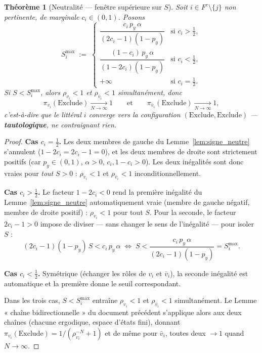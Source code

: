 \documentclass[12pt,a4paper]{article}
\newtheorem{theorem}{Théorème}[section]
\theoremstyle{remark}
\newcommand{\Exc}{\ensuremath{\mathrm{Exclude}}}
\newcommand{\vbar}{\bar{v}}
\begin{document}
\begin{theorem}[Neutralité --- fenêtre supérieure sur $S$]\label{thm:neutralite}
Soit $i\in F^c\setminus\{j\}$ non pertinente, de marginale $c_i\in(0,1)$. Posons
\[
  S_i^{\max} \;:=\;
  \begin{cases}
    \dfrac{c_i\,p_y\,\alpha}{(2c_i-1)(1-p_y)} & \text{si } c_i > \tfrac12, \\[10pt]
    \dfrac{(1-c_i)\,p_y\,\alpha}{(1-2c_i)(1-p_y)} & \text{si } c_i < \tfrac12, \\[10pt]
    +\infty & \text{si } c_i = \tfrac12.
  \end{cases}
\]
Si $S < S_i^{\max}$, alors $\rho_{v_i}<1$ \emph{et} $\rho_{\vbar_i}<1$
simultanément, donc
\[
  \pi_{v_i}(\Exc) \xrightarrow[N\to\infty]{} 1
  \qquad\text{et}\qquad
  \pi_{\vbar_i}(\Exc) \xrightarrow[N\to\infty]{} 1,
\]
c'est-à-dire que le littéral $i$ converge vers la configuration $(\Exc,\Exc)$
--- \textbf{tautologique}, ne contraignant rien.
\end{theorem}

\begin{proof}
\textbf{Cas $c_i=\tfrac12$.} Les deux membres de gauche du
Lemme~\ref{lem:signe_neutre} s'annulent ($1-2c_i=2c_i-1=0$), et les deux membres de
droite sont strictement positifs (car $p_y\in(0,1)$, $\alpha>0$, $c_i,1-c_i>0$).
Les deux inégalités sont donc vraies pour \emph{tout} $S>0$ : $\rho_{v_i}<1$ et
$\rho_{\vbar_i}<1$ inconditionnellement.

\textbf{Cas $c_i>\tfrac12$.} Le facteur $1-2c_i<0$ rend la première inégalité du
Lemme~\ref{lem:signe_neutre} automatiquement vraie (membre de gauche négatif,
membre de droite positif) : $\rho_{v_i}<1$ pour tout $S$. Pour la seconde, le
facteur $2c_i-1>0$ impose de diviser --- sans changer le sens de l'inégalité ---
pour isoler $S$ :
\[
  (2c_i-1)(1-p_y)\,S < c_i\,p_y\,\alpha
  \;\Longleftrightarrow\;
  S < \frac{c_i\,p_y\,\alpha}{(2c_i-1)(1-p_y)} = S_i^{\max}.
\]

\textbf{Cas $c_i<\tfrac12$.} Symétrique (échanger les rôles de $v_i$ et $\vbar_i$),
la seconde inégalité est automatique et la première donne le seuil correspondant.

Dans les trois cas, $S<S_i^{\max}$ entraîne $\rho_{v_i}<1$ et $\rho_{\vbar_i}<1$
simultanément. Le Lemme « chaîne bidirectionnelle » du document précédent
s'applique alors aux deux chaînes (chacune ergodique, espace d'états fini), donnant
$\pi_{v_i}(\Exc) = 1/(\rho_{v_i}^{-N}+1)$ et de même pour $\vbar_i$, toutes deux
$\to 1$ quand $N\to\infty$.
\end{proof}
\end{document}
